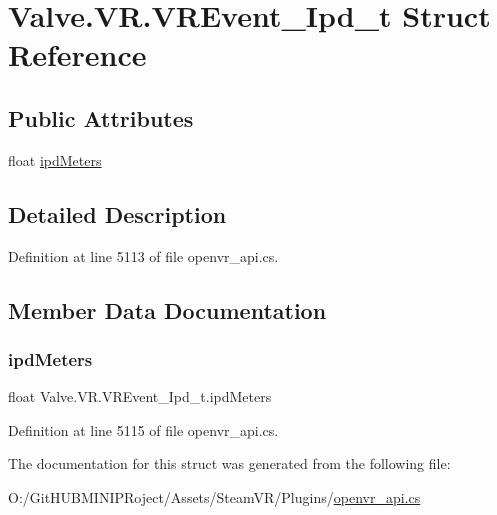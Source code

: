 \hypertarget{struct_valve_1_1_v_r_1_1_v_r_event___ipd__t}{}\section{Valve.\+V\+R.\+V\+R\+Event\+\_\+\+Ipd\+\_\+t Struct Reference}
\label{struct_valve_1_1_v_r_1_1_v_r_event___ipd__t}
\subsection*{Public Attributes}
\begin{DoxyCompactItemize}
\item 
float \mbox{\hyperlink{struct_valve_1_1_v_r_1_1_v_r_event___ipd__t_a672533caa9b34081daeb5de63bf2c4b2}{ipd\+Meters}}
\end{DoxyCompactItemize}


\subsection{Detailed Description}


Definition at line 5113 of file openvr\+\_\+api.\+cs.



\subsection{Member Data Documentation}
\mbox{\label{struct_valve_1_1_v_r_1_1_v_r_event___ipd__t_a672533caa9b34081daeb5de63bf2c4b2}} 
\subsubsection{\texorpdfstring{ipdMeters}{ipdMeters}}
{\footnotesize\ttfamily float Valve.\+V\+R.\+V\+R\+Event\+\_\+\+Ipd\+\_\+t.\+ipd\+Meters}



Definition at line 5115 of file openvr\+\_\+api.\+cs.



The documentation for this struct was generated from the following file\+:\begin{DoxyCompactItemize}
\item 
O\+:/\+Git\+H\+U\+B\+M\+I\+N\+I\+P\+Roject/\+Assets/\+Steam\+V\+R/\+Plugins/\mbox{\hyperlink{openvr__api_8cs}{openvr\+\_\+api.\+cs}}\end{DoxyCompactItemize}
